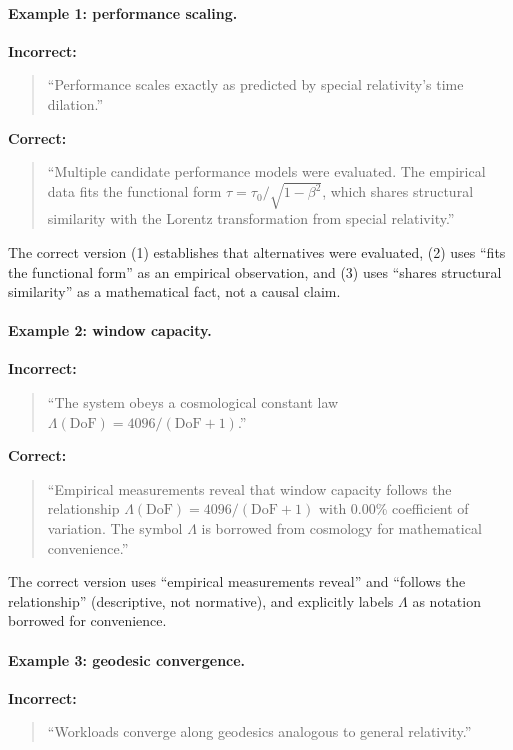 \paragraph{Example 1: performance scaling.}

\noindent\textbf{Incorrect:}
\begin{quote}
``Performance scales exactly as predicted by special relativity's time
dilation.''
\end{quote}

\noindent\textbf{Correct:}
\begin{quote}
``Multiple candidate performance models were evaluated. The empirical data
fits the functional form $\tau = \tau_0 / \sqrt{1 - \beta^2}$, which shares
structural similarity with the Lorentz transformation from special relativity.''
\end{quote}

The correct version (1) establishes that alternatives were evaluated,
(2) uses ``fits the functional form'' as an empirical observation, and
(3) uses ``shares structural similarity'' as a mathematical fact, not a
causal claim.

\paragraph{Example 2: window capacity.}

\noindent\textbf{Incorrect:}
\begin{quote}
``The system obeys a cosmological constant law $\Lambda(\text{DoF}) =
4096 / (\text{DoF}+1)$.''
\end{quote}

\noindent\textbf{Correct:}
\begin{quote}
``Empirical measurements reveal that window capacity follows the relationship
$\Lambda(\text{DoF}) = 4096 / (\text{DoF}+1)$ with 0.00\% coefficient of
variation. The symbol $\Lambda$ is borrowed from cosmology for mathematical
convenience.''
\end{quote}

The correct version uses ``empirical measurements reveal'' and ``follows the
relationship'' (descriptive, not normative), and explicitly labels $\Lambda$
as notation borrowed for convenience.

\paragraph{Example 3: geodesic convergence.}

\noindent\textbf{Incorrect:}
\begin{quote}
``Workloads converge along geodesics analogous to general relativity.''
\end{quote}

